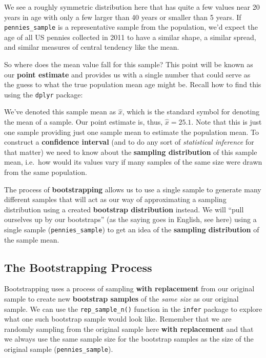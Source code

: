 \documentclass[]{article}
\newenvironment{Shaded}{\begin{snugshade}}{\end{snugshade}}
\newcommand{\KeywordTok}[1]{\textcolor[rgb]{0.13,0.29,0.53}{\textbf{#1}}}
\newcommand{\DataTypeTok}[1]{\textcolor[rgb]{0.13,0.29,0.53}{#1}}
\newcommand{\DecValTok}[1]{\textcolor[rgb]{0.00,0.00,0.81}{#1}}
\newcommand{\StringTok}[1]{\textcolor[rgb]{0.31,0.60,0.02}{#1}}
\newcommand{\OperatorTok}[1]{\textcolor[rgb]{0.81,0.36,0.00}{\textbf{#1}}}
\newcommand{\NormalTok}[1]{#1}
\begin{document}
We see a roughly symmetric distribution here that has quite a few values
near 20 years in age with only a few larger than 40 years or smaller
than 5 years. If \texttt{pennies\_sample} is a representative sample
from the population, we'd expect the age of all US pennies collected in
2011 to have a similar shape, a similar spread, and similar measures of
central tendency like the mean.

So where does the mean value fall for this sample? This point will be
known as our \textbf{point estimate} and provides us with a single
number that could serve as the guess to what the true population mean
age might be. Recall how to find this using the \texttt{dplyr} package:

\begin{Shaded}
\end{Shaded}

We've denoted this sample mean as \(\hat{x}\), which is the standard
symbol for denoting the mean of a sample. Our point estimate is, thus,
\(\hat{x}=25.1\). Note that this is just one sample providing just one
sample mean to estimate the population mean. To construct a
\textbf{confidence interval} (and to do any sort of \emph{statistical
inference} for that matter) we need to know about the \textbf{sampling
distribution} of this sample mean, i.e.~how would its values vary if
many samples of the same size were drawn from the same population.

The process of \textbf{bootstrapping} allows us to use a single sample
to generate many different samples that will act as our way of
approximating a sampling distribution using a created \textbf{bootstrap
distribution} instead. We will ``pull ourselves up by our bootstraps''
(as the saying goes in English, see here) using a single sample
(\texttt{pennies\_sample}) to get an idea of the \textbf{sampling
distribution} of the sample mean.

\subsection{The Bootstrapping Process}\label{the-bootstrapping-process}

Bootstrapping uses a process of sampling \textbf{with replacement} from
our original sample to create new \textbf{bootstrap samples} of the
\emph{same size} as our original sample. We can use the
\texttt{rep\_sample\_n()} function in the \texttt{infer} package to
explore what one such bootstrap sample would look like. Remember that we
are randomly sampling from the original sample here \textbf{with
replacement} and that we always use the same sample size for the
bootstrap samples as the size of the original sample
(\texttt{pennies\_sample}).
\end{document}
